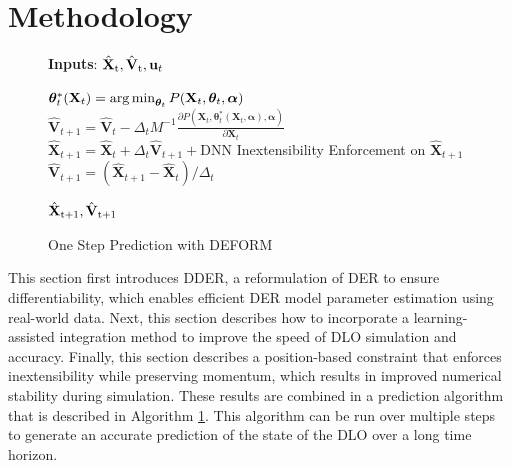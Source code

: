 \section{Methodology}
\begin{figure}
      \vspace*{-23pt}
    \begin{minipage}{0.56\textwidth}
      \begin{algorithm}[H]
\caption{One Step Prediction with DEFORM} 
\label{alg:long time horizon}
\textbf{Inputs}: $\hat{\textbf{X}}_\text{t}, \hat{\textbf{V}}_\text{t}, \textbf{u}_t$
\begin{algorithmic}[1]
\State $\bm{\theta}^*_t(\textbf{X}_t) = \operatorname*{arg\,min}_{\bm{\theta}_t} P(\textbf{X}_t, \bm{\theta}_t,\bm{\alpha})$ 
\State $\hat{\textbf{V}}_{t+1} = \hat{\textbf{V}}_t-\Delta_tM^{-1}\frac{\partial P(\textbf{X}_t, \bm{\theta}^*_t(\textbf{X}_t,\bm{\alpha}),\bm{\alpha})}{\partial \textbf{X}_{t}}$ \Comment{\eqref{eq:Semi-Euler1}}   
\State $\hat{\textbf{X}}_{t+1} = \hat{\textbf{X}}_t + \Delta_t\hat{\textbf{V}}_{t+1} + \text{DNN}$ 
\State Inextensibility Enforcement on $\hat{\textbf{X}}_{t+1}$ 
\State $\hat{\textbf{V}}_{t+1} = (\hat{\textbf{X}}_{t+1} - \hat{\textbf{X}}_t)/\Delta_t$ 
\end{algorithmic}
\Return $\hat{\textbf{X}}_\text{t+1}, \hat{\textbf{V}}_\text{t+1}$
\end{algorithm}
    \end{minipage}
    \vspace*{-6pt}
  \end{figure}
This section first introduces DDER, a reformulation of DER to ensure differentiability, which enables efficient DER model parameter estimation using real-world data.
Next, this section describes how to incorporate a learning-assisted integration method to improve the speed of DLO simulation and accuracy.
Finally, this section describes a position-based constraint that enforces inextensibility while preserving momentum, which results in improved numerical stability during simulation.
These results are combined in a prediction algorithm that is described in Algorithm \ref{alg:long time horizon}.
This algorithm can be run over multiple steps to generate an accurate prediction of the state of the DLO over a long time horizon. 

